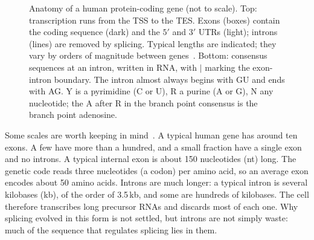 \begin{figure}[!htbp]
  \caption{Anatomy of a human protein-coding gene (not to scale). Top: transcription runs from the TSS to the TES. Exons (boxes) contain the coding sequence (dark) and the $5'$ and $3'$ UTRs (light); introns (lines) are removed by splicing. Typical lengths are indicated; they vary by orders of magnitude between genes~\citep{piovesan2016}. Bottom: consensus sequences at an intron, written in RNA, with $|$ marking the exon-intron boundary. The intron almost always begins with GU and ends with AG. Y is a pyrimidine (C or U), R a purine (A or G), N any nucleotide; the A after R in the branch point consensus is the branch point adenosine.}
  \label{fig:gene_anatomy}
\end{figure}

Some scales are worth keeping in mind~\citep{piovesan2016}. A typical human gene has around ten exons. A few have more than a hundred, and a small fraction have a single exon and no introns. A typical internal exon is about 150 nucleotides (nt) long. The genetic code reads three nucleotides (a codon) per amino acid, so an average exon encodes about 50 amino acids. Introns are much longer: a typical intron is several kilobases (kb), of the order of 3.5\,kb, and some are hundreds of kilobases. The cell therefore transcribes long precursor RNAs and discards most of each one. Why splicing evolved in this form is not settled, but introns are not simply waste: much of the sequence that regulates splicing lies in them.

